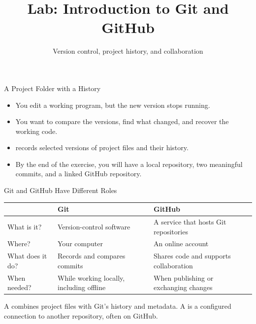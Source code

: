 \newcommand{\CourseTemplatePath}{../../../../../templates/slides/}

\title[Git and GitHub]{Lab: Introduction to Git and GitHub}
\subtitle{Version control, project history, and collaboration}

\makecoursetitle

\begin{frame}{A Project Folder with a History}
\par
\begin{itemize}
\item You edit a working program, but the new version stops running.
\item You want to compare the versions, find what changed, and recover the working code.
\item {} records selected versions of project files and their history.
\item By the end of the exercise, you will have a local repository, two meaningful commits, and a linked GitHub repository.
\end{itemize}
\end{frame}

\begin{frame}{Git and GitHub Have Different Roles}
\begin{tabularx}{\linewidth}{@{}lYY@{}}
\toprule & \textbf{Git} & \textbf{GitHub}\\\midrule
What is it? & Version-control software & A service that hosts Git repositories\\
Where? & Your computer & An online account\\
What does it do? & Records and compares commits & Shares code and supports collaboration\\
When needed? & While working locally, including offline & When publishing or exchanging changes\\\bottomrule
\end{tabularx}
\par\medskip
A  combines project files with Git's history and metadata. A  is a configured connection to another repository, often on GitHub.
\end{frame}

